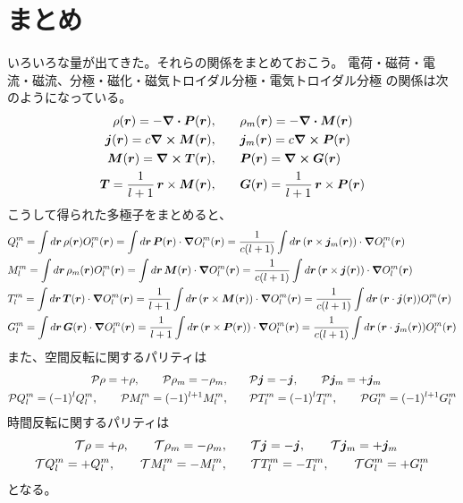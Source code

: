 \documentclass[../master.tex]{subfiles}
\begin{document}
\section{まとめ}
いろいろな量が出てきた。それらの関係をまとめておこう。
電荷・磁荷・電流・磁流、分極・磁化・磁気トロイダル分極・電気トロイダル分極
の関係は次のようになっている。
\begin{align}
    \rho(\vb*{r}) = -\div \vb*{P}(\vb*{r}), \quad & \quad \rho_m(\vb*{r}) = -\div \vb*{M}(\vb*{r})\\
    \vb*{j}(\vb*{r}) = c\curl \vb*{M}(\vb*{r}), \quad & \quad \vb*{j}_m(\vb*{r}) = c \curl \vb*{P}(\vb*{r})\\
    \vb*{M}(\vb*{r}) = \curl \vb*{T}(\vb*{r}), \quad & \quad \vb*{P}(\vb*{r}) = \curl \vb*{G}(\vb*{r})\\
    \vb*{T} = \frac{1}{l+1}\, \vb*{r}\times\vb*{M}(\vb*{r}), \quad & \quad \vb*{G}(\vb*{r}) = \frac{1}{l+1}\, \vb*{r}\times\vb*{P}(\vb*{r})
\end{align}
こうして得られた多極子をまとめると、
\begin{align}
    &Q_l^m
    = \int d\vb*{r}\, \rho(\vb*{r})O_l^m(\vb*{r})
    = \int d\vb*{r}\, \vb*{P}(\vb*{r}) \cdot \grad O_l^m(\vb*{r})
    = \frac{1}{c(l+1)}\int d\vb*{r}\, (\vb*{r}\times \vb*{j}_m(\vb*{r})) \cdot \grad O_l^m(\vb*{r})\\
    &M_l^m
    = \int d\vb*{r}\, \rho_m(\vb*{r})O_l^m(\vb*{r})
    = \int d\vb*{r}\, \vb*{M}(\vb*{r}) \cdot \grad O_l^m(\vb*{r})
    = \frac{1}{c(l+1)}\int d\vb*{r}\, (\vb*{r}\times \vb*{j}(\vb*{r})) \cdot \grad O_l^m(\vb*{r})\\
    &T_l^m
    = \int d\vb*{r}\, \vb*{T}(\vb*{r})\cdot \grad O_l^m(\vb*{r})
    = \frac{1}{l+1}\int d\vb*{r}\, (\vb*{r} \times \vb*{M}(\vb*{r}))\cdot \grad O_l^m(\vb*{r})
    = \frac{1}{c(l+1)}\int d\vb*{r}\, (\vb*{r}\cdot \vb*{j}(\vb*{r})) O_l^m(\vb*{r})\\
    &G_l^m
    = \int d\vb*{r}\, \vb*{G}(\vb*{r})\cdot \grad O_l^m(\vb*{r})
    = \frac{1}{l+1}\int d\vb*{r}\, (\vb*{r} \times \vb*{P}(\vb*{r}))\cdot \grad O_l^m(\vb*{r})
    = \frac{1}{c(l+1)}\int d\vb*{r}\, (\vb*{r}\cdot \vb*{j}_m(\vb*{r})) O_l^m(\vb*{r})
\end{align}
また、空間反転に関するパリティは
\begin{align}
    \mathcal{P} \rho = + \rho, \qquad
    \mathcal{P} \rho_m = - \rho_m, \qquad&
    \mathcal{P} \vb*{j} = - \vb*{j}, \qquad
    \mathcal{P} \vb*{j}_m = + \vb*{j}_m\\
    \mathcal{P}Q_l^m = (-1)^{l}Q_l^m,\qquad
    \mathcal{P}M_l^m = (-1)^{l+1}M_l^m,\qquad&
    \mathcal{P}T_l^m = (-1)^{l}T_l^m,\qquad
    \mathcal{P}G_l^m = (-1)^{l+1}G_l^m
\end{align}
時間反転に関するパリティは
\begin{align}
    \mathcal{T} \rho = + \rho, \qquad
    \mathcal{T} \rho_m = - \rho_m, \qquad&
    \mathcal{T} \vb*{j} = - \vb*{j}, \qquad
    \mathcal{T} \vb*{j}_m = + \vb*{j}_m\\
    \mathcal{T}Q_l^m = +Q_l^m,\qquad
    \mathcal{T}M_l^m = -M_l^m,\qquad&
    \mathcal{T}T_l^m = -T_l^m,\qquad
    \mathcal{T}G_l^m = +G_l^m
\end{align}
となる。
\end{document}
